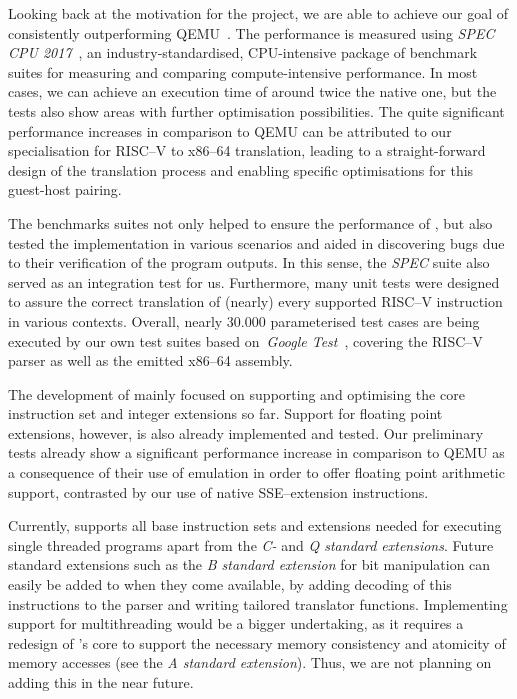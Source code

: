 Looking back at the motivation for the project, we are able to achieve our goal of consistently outperforming QEMU~\cite{bellard2005qemu}.
The performance is measured using \textit{SPEC CPU 2017}~\cite{spec-cpu-2017}, an industry-standardised, CPU-intensive package of benchmark suites for measuring and comparing compute-intensive performance.
In most cases, we can achieve an execution time of around twice the native one, but the tests also show areas with further optimisation possibilities.
The quite significant performance increases in comparison to QEMU can be attributed to our specialisation for RISC--V to x86--64 translation, leading to a straight-forward design of the translation process and enabling specific optimisations for this guest-host pairing.

The benchmarks suites not only helped to ensure the performance of \translatorname{}, but also tested the implementation in various scenarios and aided in discovering bugs due to their verification of the program outputs.
In this sense, the \textit{SPEC} suite also served as an integration test for us.
Furthermore, many unit tests were designed to assure the correct translation of (nearly) every supported RISC--V instruction in various contexts.
Overall, nearly 30.000 parameterised test cases are being executed by our own test suites based on~\textit{Google Test}~\cite{gtest}, covering the RISC--V parser as well as the emitted x86--64 assembly.

The development of \translatorname{} mainly focused on supporting and optimising the core instruction set and integer extensions so far.
Support for floating point extensions, however, is also already implemented and tested.
Our preliminary tests already show a significant performance increase in comparison to QEMU as a consequence of their use of emulation in order to offer floating point arithmetic support, contrasted by our use of native SSE--extension instructions.

Currently, \translatorname{} supports all base instruction sets and extensions needed for executing single threaded programs apart from the \textit{C-} and \textit{Q standard extensions}.
Future standard extensions such as the \textit{B standard extension} for bit manipulation can easily be added to \translatorname{} when they come available, by adding decoding of this instructions to the parser and writing tailored translator functions.
Implementing support for multithreading would be a bigger undertaking, as it requires a redesign of \translatorname{}'s core to support the necessary memory consistency and atomicity of memory accesses (see the \textit{A standard extension}).
Thus, we are not planning on adding this in the near future.

